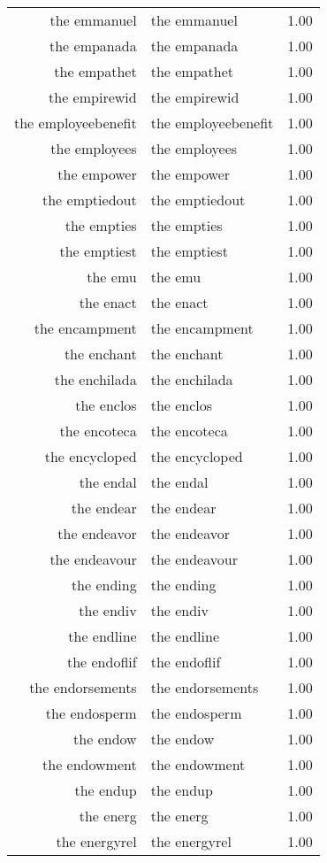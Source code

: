 \begin{table}[ht]
\begin{tabular}{rlr}
  the emmanuel & the emmanuel & 1.00 \\ 
  the empanada & the empanada & 1.00 \\ 
  the empathet & the empathet & 1.00 \\ 
  the empirewid & the empirewid & 1.00 \\ 
  the employeebenefit & the employeebenefit & 1.00 \\ 
  the employees & the employees & 1.00 \\ 
  the empower & the empower & 1.00 \\ 
  the emptiedout & the emptiedout & 1.00 \\ 
  the empties & the empties & 1.00 \\ 
  the emptiest & the emptiest & 1.00 \\ 
  the emu & the emu & 1.00 \\ 
  the enact & the enact & 1.00 \\ 
  the encampment & the encampment & 1.00 \\ 
  the enchant & the enchant & 1.00 \\ 
  the enchilada & the enchilada & 1.00 \\ 
  the enclos & the enclos & 1.00 \\ 
  the encoteca & the encoteca & 1.00 \\ 
  the encycloped & the encycloped & 1.00 \\ 
  the endal & the endal & 1.00 \\ 
  the endear & the endear & 1.00 \\ 
  the endeavor & the endeavor & 1.00 \\ 
  the endeavour & the endeavour & 1.00 \\ 
  the ending & the ending & 1.00 \\ 
  the endiv & the endiv & 1.00 \\ 
  the endline & the endline & 1.00 \\ 
  the endoflif & the endoflif & 1.00 \\ 
  the endorsements & the endorsements & 1.00 \\ 
  the endosperm & the endosperm & 1.00 \\ 
  the endow & the endow & 1.00 \\ 
  the endowment & the endowment & 1.00 \\ 
  the endup & the endup & 1.00 \\ 
  the energ & the energ & 1.00 \\ 
  the energyrel & the energyrel & 1.00 \\ 

\end{tabular}
\end{table}
